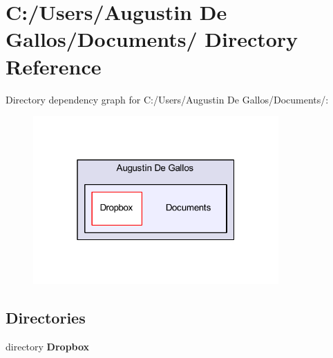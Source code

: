 \section{C\-:/\-Users/\-Augustin De Gallos/\-Documents/ Directory Reference}
\label{dir_184ebfc8ab87340e88bd3598927c1794}
Directory dependency graph for C\-:/\-Users/\-Augustin De Gallos/\-Documents/\-:\nopagebreak
\begin{figure}[H]
\begin{center}
\leavevmode
\includegraphics[width=266pt]{dir_184ebfc8ab87340e88bd3598927c1794_dep}
\end{center}
\end{figure}
\subsection*{Directories}
\begin{DoxyCompactItemize}
\item 
directory {\bf Dropbox}
\end{DoxyCompactItemize}
